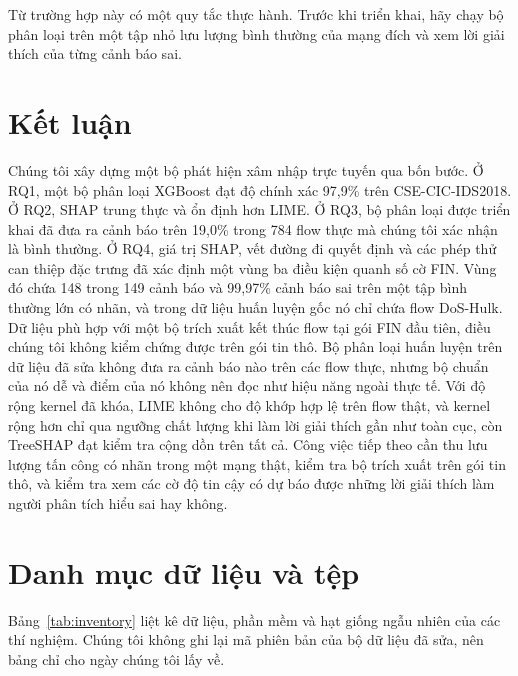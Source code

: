 \documentclass[conference]{IEEEtran}
\begin{document}
Từ trường hợp này có một quy tắc thực hành. Trước khi triển khai, hãy chạy bộ phân loại trên một tập nhỏ lưu lượng bình thường của mạng đích và xem lời giải thích của từng cảnh báo sai.

\section{Kết luận}
Chúng tôi xây dựng một bộ phát hiện xâm nhập trực tuyến qua bốn bước. Ở RQ1, một bộ phân loại XGBoost đạt độ chính xác 97,9\% trên CSE-CIC-IDS2018. Ở RQ2, SHAP trung thực và ổn định hơn LIME. Ở RQ3, bộ phân loại được triển khai đã đưa ra cảnh báo trên 19,0\% trong 784 flow thực mà chúng tôi xác nhận là bình thường. Ở RQ4, giá trị SHAP, vết đường đi quyết định và các phép thử can thiệp đặc trưng đã xác định một vùng ba điều kiện quanh số cờ FIN. Vùng đó chứa 148 trong 149 cảnh báo và 99,97\% cảnh báo sai trên một tập bình thường lớn có nhãn, và trong dữ liệu huấn luyện gốc nó chỉ chứa flow DoS-Hulk. Dữ liệu phù hợp với một bộ trích xuất kết thúc flow tại gói FIN đầu tiên, điều chúng tôi không kiểm chứng được trên gói tin thô. Bộ phân loại huấn luyện trên dữ liệu đã sửa không đưa ra cảnh báo nào trên các flow thực, nhưng bộ chuẩn của nó dễ và điểm của nó không nên đọc như hiệu năng ngoài thực tế. Với độ rộng kernel đã khóa, LIME không cho độ khớp hợp lệ trên flow thật, và kernel rộng hơn chỉ qua ngưỡng chất lượng khi làm lời giải thích gần như toàn cục, còn TreeSHAP đạt kiểm tra cộng dồn trên tất cả. Công việc tiếp theo cần thu lưu lượng tấn công có nhãn trong một mạng thật, kiểm tra bộ trích xuất trên gói tin thô, và kiểm tra xem các cờ độ tin cậy có dự báo được những lời giải thích làm người phân tích hiểu sai hay không.

\appendices
\section{Danh mục dữ liệu và tệp}
Bảng~\ref{tab:inventory} liệt kê dữ liệu, phần mềm và hạt giống ngẫu nhiên của các thí nghiệm. Chúng tôi không ghi lại mã phiên bản của bộ dữ liệu đã sửa, nên bảng chỉ cho ngày chúng tôi lấy về.
\end{document}

